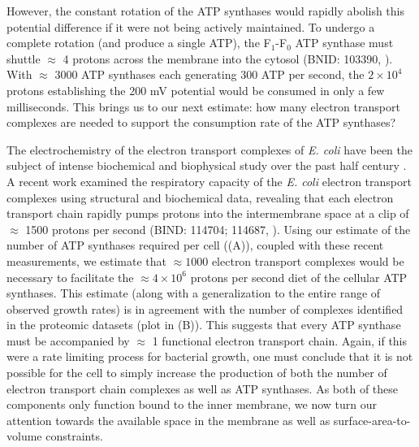 However, the constant rotation of the ATP synthases would rapidly abolish
this potential difference if it were not being actively maintained. To
undergo a complete rotation (and produce a single ATP), the F$_1$-F$_0$ ATP
synthase must shuttle $\approx$ 4 protons across the membrane into the
cytosol (BNID: 103390, \cite{milo2010}). With $\approx$ 3000 ATP synthases each
generating 300 ATP per second, the $2 \times 10^4$ protons establishing the 200
mV potential would be consumed in only a few milliseconds. This brings us
to our next estimate: how many electron transport complexes are needed to
support the consumption rate of the ATP synthases?

The electrochemistry of the electron transport complexes of \textit{E. coli}
have been the subject of intense biochemical and biophysical study over the past
half century \citep{ingledew1984, khademian2017,cox1970,henkel2014}. A recent
work \citep{szenk2017} examined the respiratory capacity of the \textit{E. coli}
electron transport complexes using structural and biochemical data, revealing
that each electron transport chain rapidly pumps protons into the intermembrane
space at a clip of $\approx$ 1500 protons per second (BIND: 114704; 114687,
\cite{milo2010}). Using our estimate of the number of ATP synthases required per
cell ((A)), coupled with these recent measurements, we
estimate that $\approx 1000$ electron transport complexes would be necessary to
facilitate the $\approx 4\times 10^6$ protons per second diet of the cellular
ATP synthases. This estimate (along with a generalization to the entire range of
observed growth rates) is in agreement with the number of complexes
identified in the proteomic datasets (plot in (B)). This
suggests that every ATP synthase must be accompanied by $\approx$ 1 functional
electron transport chain. Again, if this were a rate limiting process for
bacterial growth, one must conclude that it is not possible for the cell to
simply increase the production of both the number of electron transport chain
complexes as well as ATP synthases. As both of these components only function
bound to the inner membrane, we now turn our attention towards the available
space in the membrane as well as surface-area-to-volume constraints.


